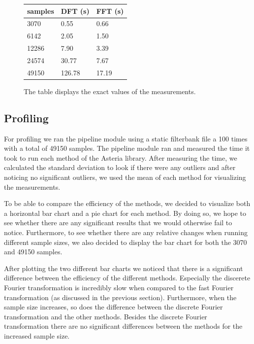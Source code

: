 \documentclass[a4paper,11pt]{report}
\begin{document}
    \begin{figure}[h]
        \centering
        \begin{tabular}{|l|l|l|}
            \hline
            samples & DFT (s) & FFT (s) \\ \hline
            3070    & 0.55    & 0.66    \\ \hline
            6142    & 2.05    & 1.50    \\ \hline
            12286   & 7.90    & 3.39    \\ \hline
            24574   & 30.77   & 7.67    \\ \hline
            49150   & 126.78  & 17.19   \\ \hline
        \end{tabular}
        \caption{The table displays the exact values of the measurements.}
    \end{figure}

    \subsection{Profiling}

    For profiling we ran the pipeline module using a static filterbank file a 100 times with a total of 49150 samples. The pipeline module ran and measured the time it took
    to run each method of the Asteria library. After measuring the time, we calculated the standard deviation to look if there were any outliers and after noticing no significant
    outliers, we used the mean of each method for visualizing the measurements.

    To be able to compare the efficiency of the methods, we decided to visualize both a horizontal bar chart and a pie chart for each method. By doing so, we hope to see whether
    there are any significant results that we would otherwise fail to notice. Furthermore, to see whether there are any relative changes when running different sample sizes, we
    also decided to display the bar chart for both the 3070 and 49150 samples.

    After plotting the two different bar charts we noticed that there is a significant difference between the efficiency of the different methods. Especially the discerete Fourier
    transformation is incredibly slow when compared to the fast Fourier transformation (as discussed in the previous section). Furthermore, when the sample size increases, so does the difference
    between the discrete Fourier transformation and the other methods. Besides the discrete Fourier transformation there are no significant differences between the methods for the increased sample size.
\end{document}
